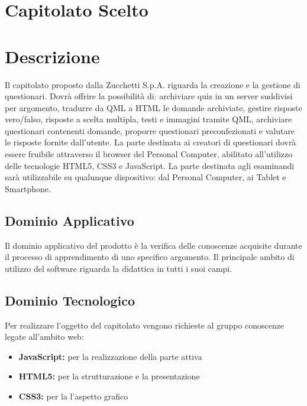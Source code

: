 \section{Capitolato Scelto}
\section{Descrizione}
Il capitolato proposto dalla Zucchetti S.p.A. riguarda la creazione e la gestione di questionari. 
Dovrà offrire la possibilità di: archiviare quiz in un server suddivisi per argomento, tradurre da QML a HTML le domande archiviate, gestire risposte vero/falso, risposte a scelta multipla, testi e immagini tramite QML, archiviare questionari contenenti domande, proporre questionari preconfezionati e valutare le risposte fornite dall’utente.
La parte destinata ai creatori di questionari dovrà essere fruibile attraverso il browser del 
Personal Computer, abilitato all’utilizzo delle tecnologie HTML5, CSS3 e JavaScript.
La parte destinata agli esaminandi sarà utilizzabile su qualunque dispositivo: dal Personal Computer, ai Tablet e Smartphone.

\subsection{Dominio Applicativo}
Il dominio applicativo del prodotto è la verifica delle conoscenze acquisite durante il processo di apprendimento di uno specifico argomento.
Il principale ambito di utilizzo del software riguarda la didattica in tutti i suoi campi.

\subsection{Dominio Tecnologico}
Per realizzare l’oggetto del capitolato vengono richieste al gruppo conoscenze legate all’ambito web:
\begin{itemize}
\item \textbf{JavaScript:} per la realizzazione della parte attiva
\item \textbf{HTML5:} per la strutturazione e la presentazione 
\item \textbf{CSS3:} per la l’aspetto grafico
\end{itemize}

